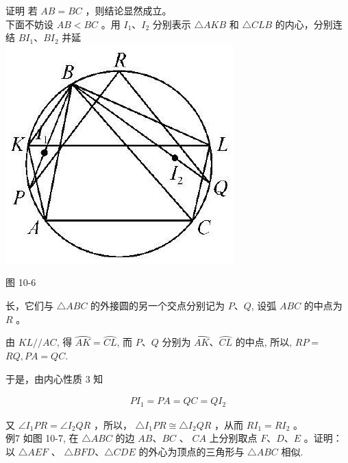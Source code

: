 \documentclass[10pt]{article}
\begin{document}
证明 若 $A B=B C$ ，则结论显然成立。\\
下面不妨设 $A B<B C$ 。用 $I_{1} 、 I_{2}$ 分别表示 $\triangle A K B$ 和 $\triangle C L B$ 的内心，分别连结 $B I_{1} 、 B I_{2}$ 并延\\
\includegraphics[max width=\textwidth, center]{2024_10_30_66b8e5e701da2093c133g-074(1)}

图 10-6

长，它们与 $\triangle A B C$ 的外接圆的另一个交点分别记为 $P 、 Q$, 设弧 $A B C$ 的中点为 $R$ 。

由 $K L / / A C$, 得 $\overparen{A K}=\overparen{C L}$, 而 $P 、 Q$ 分别为 $\overparen{A K} 、 \overparen{C L}$ 的中点, 所以, $R P=$ $R Q, P A=Q C$.

于是，由内心性质 3 知

\begin{align*}
P I_{1}=P A=Q C=Q I_{2}
\end{align*}

又 $\angle I_{1} P R=\angle I_{2} Q R$ ，所以， $\triangle I_{1} P R \cong \triangle I_{2} Q R$ ，从而 $R I_{1}=R I_{2}$ 。\\
例7 如图 10-7, 在 $\triangle A B C$ 的边 $A B 、 B C$ 、 $C A$ 上分别取点 $F 、 D 、 E$ 。证明：以 $\triangle A E F$ 、 $\triangle B F D 、 \triangle C D E$ 的外心为顶点的三角形与 $\triangle A B C$ 相似.
\end{document}
